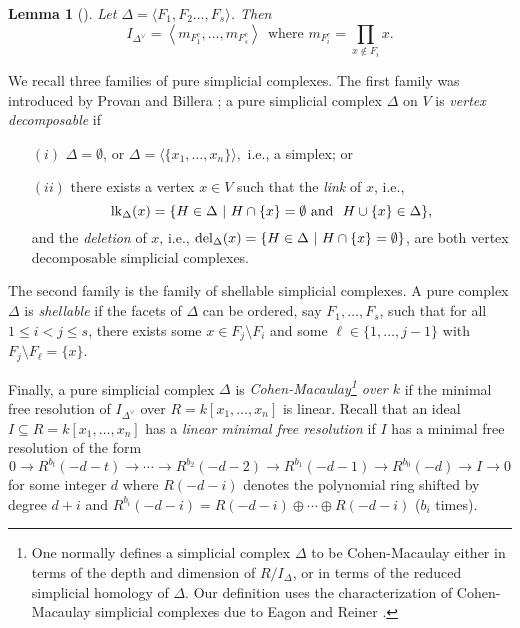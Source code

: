 \documentclass[12pt]{amsart}
\numberwithin{equation}{section}
\newtheorem{lemma}[theorem]{Lemma}
\theoremstyle{definition}
\begin{document}
\begin{lemma}[{\cite[Corollary 1.5.5]{HH}}]\label{Idv}
Let $\Delta=\langle F_1,F_2\ldots,F_s \rangle$.  Then
\[ I_{\Delta^\vee} = \left\langle m_{F_1^c},\ldots,m_{F_s^c} \right\rangle 
~~\mbox{where $m_{F_i^c} = \displaystyle\prod_{x\notin F_i}x$.}\] 
\end{lemma}

We recall three families of pure simplicial complexes. 
The first family was introduced by Provan and Billera \cite{PB};
a pure simplicial complex $\Delta$ on $V$ is {\it vertex decomposable}
if 
\begin{enumerate}
\item[$(i)$] $\Delta = \emptyset$, or $\Delta = 
\langle \{x_1,\ldots,x_n\} \rangle,$ i.e., a simplex; or
\item[$(ii)$] there exists a vertex $x \in V$ such that
the {\it link}
of $x$, i.e.,
\[\operatorname{lk}_{\Delta}(x) = \{ H \in \Delta ~|~ H \cap \{x\} = \emptyset ~\mbox{and}~~
H \cup \{x\} \in \Delta\},\]
and the {\it deletion} of $x$, i.e.,
$\operatorname{del}_{\Delta}(x) = \{H \in \Delta ~|~ H \cap \{x\} = \emptyset \}$,
are both vertex decomposable simplicial complexes.
\end{enumerate}


The second family is the family of shellable
simplicial complexes.  A pure complex $\Delta$ is
{\it shellable} if 
the facets of $\Delta$ can be ordered, say  $F_1,\ldots,F_s$, 
such that for all $1\leq i<j\leq s$, there 
exists some $x\in F_j\setminus F_i$ and some 
$\ell\in \{1,\ldots,j-1\}$ with $F_j\setminus F_\ell= \{x\}$. 

Finally, a pure simplicial complex $\Delta$ is {\it
Cohen-Macaulay\footnote[1]{One normally defines a simplicial complex
$\Delta$
to be Cohen-Macaulay either in terms of the depth and dimension
of $R/I_{\Delta}$, or in terms of the reduced simplicial homology
of $\Delta$. Our  definition uses the 
characterization of Cohen-Macaulay simplicial
complexes due to Eagon and Reiner \cite{ER}.} over $k$} 
if the minimal free resolution of $I_{\Delta^\vee}$
over $R =k[x_1,\ldots,x_n]$
is linear.  Recall that an ideal $I \subseteq R = k[x_1,\ldots,x_n]$
has a {\it linear minimal free resolution} if $I$ has a minimal free
resolution of the form
\[0 \rightarrow 
R^{b_t}(-d-t)                        
\longrightarrow
\cdots
\longrightarrow
R^{b_2}(-d-2)                        
\longrightarrow
R^{b_1}(-d-1)                        
\longrightarrow
R^{b_0}(-d)                        
\longrightarrow
I
\longrightarrow
0
\]
for some integer $d$
where $R(-d-i)$ denotes the polynomial ring shifted by degree $d+i$
and $R^{b_i}(-d-i) = R(-d-i) \oplus \cdots \oplus R(-d-i)$ ($b_i$ times).
\end{document}
